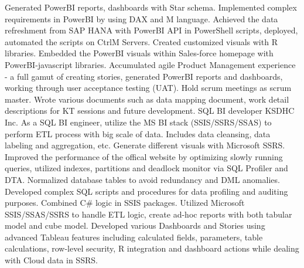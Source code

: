 \documentclass[a4paper]{ReadableCV}
\begin{document}
{Generated PowerBI reports, dashboards with Star schema. Implemented complex requirements in PowerBI by using DAX and M language.}
{Achieved the data refreshment from SAP HANA with PowerBI API in PowerShell scripts, deployed, automated the scripts on CtrlM Servers.}
{Created customized visuals with R libraries. Embedded the PowerBI visuals within Sales-force homepage with PowerBI-javascript libraries.}
{Accumulated agile Product Management experience - a full gamut of creating stories, generated PowerBI reports and dashboards, working through user acceptance testing (UAT).}
{Hold scrum meetings as scrum master. Wrote various documents such as data mapping document, work detail descriptions for KT sessions and future development.}
{SQL BI developer}
{KSDHC Inc.}
{As a SQL BI engineer, utilize the MS BI stack (SSIS/SSRS/SSAS) to perform ETL process with big scale of data. Includes data cleansing, data labeling and aggregation, etc. Generate different visuals with Microsoft SSRS. }
{Improved the performance of the offical website by optimizing slowly running queries, utilized indexes, partitions and deadlock monitor via SQL Profiler and DTA.}
{Normalized database tables to avoid redundancy and DML anomalies.}
{Developed complex SQL scripts and procedures for data profiling and auditing purposes. Combined C\# logic in SSIS packages.}
{Utilized Microsoft SSIS/SSAS/SSRS to handle ETL logic, create ad-hoc reports with both tabular model and cube model.}
{Developed various Dashboards and Stories using advanced Tableau features including calculated fields, parameters, table
calculations, row-level security, R integration and dashboard actions while dealing with Cloud data in SSRS.}





\end{document}
